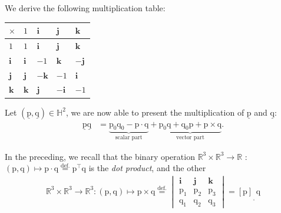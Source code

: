 \noindent We derive the following multiplication table:

\begin{center}
\setlength{\arrayrulewidth}{1pt}
\renewcommand{\arraystretch}{1.2}
\begin{tabular}{|m{1.5em}||m{1.5em}|m{1.5em}|m{1.5em}|m{1.5em}|}
    \hline
    \rowcolor{gray!25}
    \cellcolor{gray!60}$\times$ & \centering $1$ & \centering $\bm{i}$ & \centering $\bm{j}$ & \centering $\bm{k}$ \tabularnewline
    \hline\hline
    \cellcolor{gray!25}$1$ & \centering $1$ & \centering $\bm{i}$ & \centering $\bm{j}$ & \centering $\bm{k}$ \tabularnewline
    \hline
    \cellcolor{gray!25}$\bm{i}$ & \centering $\bm{i}$ & \centering $-1$ & \centering $\bm{k}$ & \centering $-\bm{j}$ \tabularnewline
    \hline
    \cellcolor{gray!25}$\bm{j}$ & \centering $\bm{j}$ & \centering $-\bm{k}$ & \centering $-1$ & \centering $\bm{i}$ \tabularnewline
    \hline
    \cellcolor{gray!25}$\bm{k}$ & \centering $\bm{k}$ & \centering $\bm{j}$ & \centering $-\bm{i}$ & \centering $-1$ \tabularnewline
    \hline
\end{tabular}
\end{center}

\bigbreak 

\noindent Let $(\underline{\bm{\mathrm{p}}}, \underline{\bm{\mathrm{q}}})\in\mathbb{H}^2$, we are now able to present the multiplication of $\underline{\bm{\mathrm{p}}}$ and $\underline{\bm{\mathrm{q}}}$:
\begin{align*}
    \underline{\bm{\mathrm{p}}}\underline{\bm{\mathrm{q}}} &= \underbrace{\mathrm{p}_0\mathrm{q}_0 - \bm{\mathrm{p}} \cdot \bm{\mathrm{q}}}_{\text{scalar part}} + \underbrace{\mathrm{p}_0\bm{\mathrm{q}} + \mathrm{q}_0\bm{\mathrm{p}} + \bm{\mathrm{p}} \times \bm{\mathrm{q}}}_{\text{vector part}}.
\end{align*}

\noindent In the preceding, we recall that the binary operation $\mathbb{R}^3\times\mathbb{R}^3\rightarrow\mathbb{R}$ : $(\bm{\mathrm{p}},\bm{\mathrm{q}})\mapsto\bm{\mathrm{p}}\cdot\bm{\mathrm{q}}\stackrel{\text{def.}}{=}\bm{\mathrm{p}}^\intercal\bm{\mathrm{q}}$ is the \textit{dot product}, and the other
\begin{align*}
	\mathbb{R}^3\times\mathbb{R}^3\rightarrow\mathbb{R}^3 : (\bm{\mathrm{p}},\bm{\mathrm{q}})\mapsto\bm{\mathrm{p}}\times\bm{\mathrm{q}}\stackrel{\text{def.}}{=}\begin{vmatrix} \bm{i} & \bm{j} & \bm{k} \\ \mathrm{p}_1 & \mathrm{p}_2 & \mathrm{p}_3 \\
		\mathrm{q}_1 & \mathrm{q}_2 & \mathrm{q}_3 \end{vmatrix}
		=[\bm{\mathrm{p}}]_{_{_\times}}\bm{\mathrm{q}}
\end{align*}

